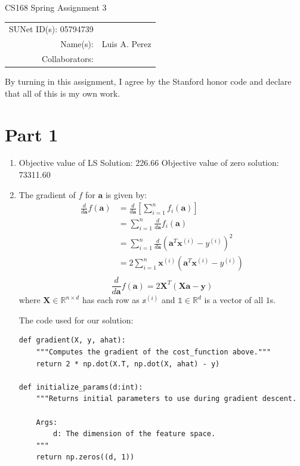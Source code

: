\documentclass[12pt]{article}
\begin{document}
\begin{center}
{\Large CS168 Spring Assignment 3}

\begin{tabular}{rl}
SUNet ID(s): 05794739 & \\
Name(s): & Luis A. Perez \\
Collaborators: &
\end{tabular}
\end{center}

By turning in this assignment, I agree by the Stanford honor code and declare
that all of this is my own work.

\section*{Part 1}

\begin{enumerate}[label=(\alph*)]
  \item
    Objective value of LS Solution: 226.66
    Objective value of zero solution: 73311.60
  \item
    The gradient of $f$ for $\mathbf{a}$ is given by:
    \begin{align*}
      \frac{d}{d\mathbf{a}} f(\mathbf{a}) &= \frac{d}{d\mathbf{a}}\left[ \sum_{i=1}^n f_i(\mathbf{a})\right] \tag{Definition of $f$} \\
      &=  \sum_{i=1}^n \frac{d}{d\mathbf{a}} f_i(\mathbf{a}) \tag{Properties of derivatives} \\
      &= \sum_{i=1}^n \frac{d}{d\mathbf{a}} (\mathbf{a}^T\mathbf{x}^{(i)} - y^{(i)})^2 \\
      &= 2 \sum_{i=1}^n  \mathbf{x}^{(i)}(\mathbf{a}^T\mathbf{x}^{(i)} - y^{(i)}) \\
    \end{align*}
    \[
      \frac{d}{d\mathbf{a}} f(\mathbf{a}) = 2\mathbf{X}^T (\mathbf{X}\mathbf{a} - \mathbf{y})
    \]
    where $\mathbf{X} \in \mathbb{R}^{n \times d}$ has each row as $\mathbb{x}^{(i)}$ and $\mathbb{1} \in \mathbb{R}^d$ is a vector of all $1$s.

  The code used for our solution:
\begin{verbatim}
def gradient(X, y, ahat):
    """Computes the gradient of the cost_function above."""
    return 2 * np.dot(X.T, np.dot(X, ahat) - y)

def initialize_params(d:int):
    """Returns initial parameters to use during gradient descent.
    
    Args:
        d: The dimension of the feature space.
    """
    return np.zeros((d, 1))
    

\end{verbatim}
\end{enumerate}
\end{document}
